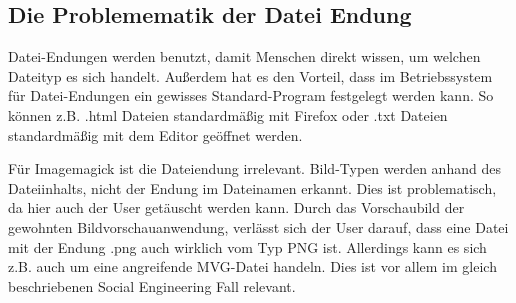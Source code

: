 \subsection{Die Problemematik der Datei Endung}\label{subsec:die-problemematik-der-datei-endung}
Datei-Endungen werden benutzt, damit Menschen direkt wissen, um welchen Dateityp es sich handelt.
Außerdem hat es den Vorteil, dass im Betriebssystem für Datei-Endungen ein gewisses Standard-Program festgelegt werden kann.
So können z.B. .html Dateien standardmäßig mit Firefox oder .txt Dateien standardmäßig mit dem Editor geöffnet werden.

Für Imagemagick ist die Dateiendung irrelevant.
Bild-Typen werden anhand des Dateiinhalts, nicht der Endung im Dateinamen erkannt.
Dies ist problematisch, da hier auch der User getäuscht werden kann.
Durch das Vorschaubild der gewohnten Bildvorschauanwendung, verlässt sich der User darauf, dass eine Datei mit der Endung .png auch wirklich vom Typ PNG ist.
Allerdings kann es sich z.B. auch um eine angreifende MVG-Datei handeln.
Dies ist vor allem im gleich beschriebenen Social Engineering Fall relevant.